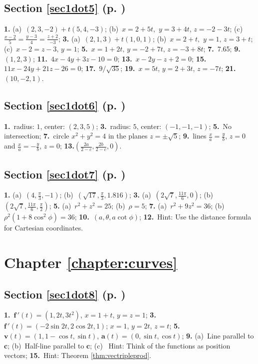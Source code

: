 \begin{multicols}{2}
\subsection*{Section \ref{sec1dot5} (p. \pageref{sec1dot5})}
\textbf{1.}
(a)~$(2,3,-2) + t(5,4,-3)$; \quad 
(b)~$x = 2 + 5t,$ $y = 3 + 4t$, $z = -2 - 3t$; \quad 
(c)~$\frac{x - 2}{5} = \frac{y - 3}{4} = \frac{z + 2}{-3}$;\quad
\textbf{3.} 
(a)~$(2,1,3) + t(1,0,1)$; \quad 
(b)~$x = 2 + t,$ $y = 1, \, z = 3 + t$;\quad 
(c)~$x - 2 = z - 3, \, y = 1$;\quad
\textbf{5.}~$x = 1 + 2t, \, y = -2 + 7t, \, z = -3 + 8t$;\quad
\textbf{7.}~7.65; \quad
\textbf{9.}~$(1,2,3)$;\quad
\textbf{11.}~$4x - 4y + 3z - 10 = 0$;\quad
\textbf{13.}~$x - 2y - z + 2 = 0$;\quad
\textbf{15.}~$11x - 24y + 21z - 26 = 0$; \quad 
\textbf{17.}~$9/\sqrt{35}$;\quad
\textbf{19.}~$x = 5t$, $y = 2 + 3t$, $z = -7t$;\quad
\textbf{21.}~$(10,-2,1)$.

\subsection*{Section \ref{sec1dot6} (p. \pageref{sec1dot6})}
\textbf{1.}~radius: $1$, center: $(2,3,5)$; \quad \textbf{3.}~radius: $5$, center: $(-1,-1,-1)$; \quad \textbf{5.}~No intersection;\quad
\textbf{7.}~circle $x^2 + y^2 = 4$ in the planes $z = \pm \sqrt{5}$; \quad
\textbf{9.}~lines
$\frac{x}{a} = \frac{y}{b}$, $z = 0$ and $\frac{x}{a} = -\frac{y}{b}$, $z = 0$; \quad
\textbf{13.}$\left( \frac{2a}{2 - c}, \frac{2b}{2 - c}, 0 \right)$.

\subsection*{Section \ref{sec1dot7} (p. \pageref{sec1dot7})}
\textbf{1.} 
(a)~$(4,\frac{\pi}{3},-1)$; \quad 
(b)~$(\sqrt{17},\frac{\pi}{3},1.816)$; \quad
\textbf{3.}
(a)~$(2\sqrt{7},\frac{11\pi}{6},0)$; \quad 
(b)~$(2\sqrt{7},\frac{11\pi}{6},\frac{\pi}{2})$; \quad
\textbf{5.} 
(a)~$r^2 + z^2 = 25$; \quad
(b)~$\rho = 5$; \quad
\textbf{7.} 
(a)~$r^2 + 9z^2 = 36$; \quad 
(b)~$\rho^2 ( 1 + 8 \cos^2 \phi ) = 36$; \quad
\textbf{10.}~$(a,\theta,a \cot \phi )$;\quad 
\textbf{12.}~Hint: Use the distance formula for Cartesian coordinates.

\section*{Chapter \ref{chapter:curves}}
\subsection*{Section \ref{sec1dot8} (p. \pageref{sec1dot8})}
\textbf{1.}~$\textbf{f}\,'(t) = (1,2t,3t^2)$, $x = 1 + t$, $y = z = 1$; \quad
\textbf{3.}~$\textbf{f}\,'(t) =
(-2\sin 2t,2\cos 2t,1)$; $x = 1$, $y = 2t$, $z = t$; \quad \textbf{5.}~$\textbf{v}(t) = (1,1 - \cos t,\sin t)$,
$\textbf{a}(t) = (0,\sin t,\cos t)$; \quad
\textbf{9.} 
(a)~Line parallel to $\mathbf{c}$; \quad 
(b)~Half-line parallel to $\mathbf{c}$; \quad 
(c)~ Hint:  Think of the functions as position vectors; \quad
\textbf{15.}~Hint: Theorem \ref{thm:vectripleprod}.


\end{multicols}
